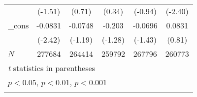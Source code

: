 {\begin{longtable}{l*{5}{c}}
            &     (-1.51)         &      (0.71)         &      (0.34)         &     (-0.94)         &     (-2.40)         \\
\_cons      &     -0.0831\sym{*}  &     -0.0748         &      -0.203         &     -0.0696         &      0.0831         \\
            &     (-2.42)         &     (-1.19)         &     (-1.28)         &     (-1.43)         &      (0.81)         \\
\hline
\(N\)       &      277684         &      264414         &      259792         &      267796         &      260773         \\
\hline\hline
\multicolumn{6}{l}{\footnotesize \textit{t} statistics in parentheses}\\
\multicolumn{6}{l}{\footnotesize \sym{*} \(p<0.05\), \sym{**} \(p<0.01\), \sym{***} \(p<0.001\)}\\
\label{tab:oaxaca_female}
\end{longtable}
}
